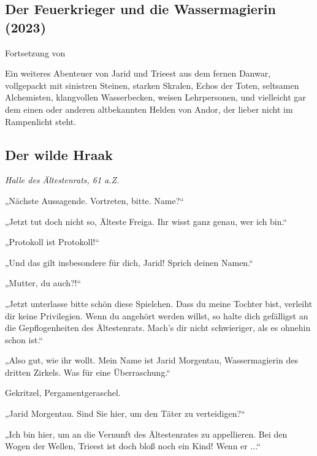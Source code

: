 \begin{chapterbox}
    \chapter{Der Feuerkrieger und die Wassermagierin (2023)}
    \label{Der Feuerkrieger und die Wassermagierin (2023)}

    \begin{center}
        Fortsetzung von 
    \end{center}
    
    Ein weiteres Abenteuer von Jarid und Trieest aus dem fernen Danwar, vollgepackt mit sinistren Steinen, starken Skralen, Echos der Toten, seltsamen Alchemisten, klangvollen Wasserbecken, weisen Lehrpersonen, und vielleicht gar dem einen oder anderen altbekannten Helden von Andor, der lieber nicht im Rampenlicht steht.
\end{chapterbox}


\section{Der wilde Hraak}


\textit{Halle des Ältestenrats, 61 a.Z.}\bigskip



„Nächste Aussagende. Vortreten, bitte. Name?“

„Jetzt tut doch nicht so, Älteste Freiga. Ihr wisst ganz genau, wer ich bin.“

„Protokoll ist Protokoll!“

„Und das gilt insbesondere für dich, Jarid! Sprich deinen Namen.“

„Mutter, du auch?!“

„Jetzt unterlasse bitte schön diese Spielchen. Dass du meine Tochter bist, verleiht dir keine Privilegien. Wenn du angehört werden willst, so halte dich gefälligst an die Gepflogenheiten des Ältestenrats. Mach’s dir nicht schwieriger, als es ohnehin schon ist.“

„Also gut, wie ihr wollt. Mein Name ist Jarid Morgentau, Wassermagierin des dritten Zirkels. Was für eine Überraschung.“

Gekritzel, Pergamentgeraschel.

„Jarid Morgentau. Sind Sie hier, um den Täter zu verteidigen?“

„Ich bin hier, um an die Vernunft des Ältestenrates zu appellieren. Bei den Wogen der Wellen, Trieest ist doch bloß noch ein Kind! Wenn er ...“

